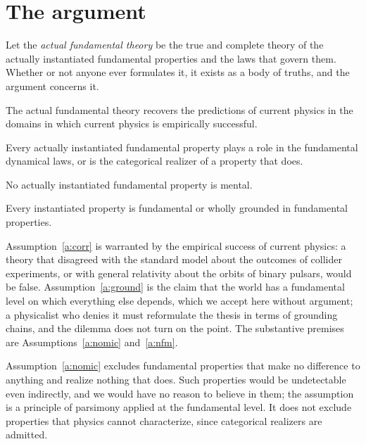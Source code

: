 \documentclass{situationist-preprint}
\begin{document}
\section{The argument}\label{s:argument}

Let the \emph{actual fundamental theory} be the true and complete theory of the actually instantiated fundamental properties and the laws that govern them. Whether or not anyone ever formulates it, it exists as a body of truths, and the argument concerns it.

\begin{assumption}[Correspondence]\label{a:corr}
The actual fundamental theory recovers the predictions of current physics in the domains in which current physics is empirically successful.
\end{assumption}

\begin{assumption}\label{a:nomic}
Every actually instantiated fundamental property plays a role in the fundamental dynamical laws, or is the categorical realizer of a property that does.
\end{assumption}

\begin{assumption}\label{a:nfm}
No actually instantiated fundamental property is mental.
\end{assumption}

\begin{assumption}\label{a:ground}
Every instantiated property is fundamental or wholly grounded in fundamental properties.
\end{assumption}

Assumption~\ref{a:corr} is warranted by the empirical success of current physics: a theory that disagreed with the standard model about the outcomes of collider experiments, or with general relativity about the orbits of binary pulsars, would be false. Assumption~\ref{a:ground} is the claim that the world has a fundamental level on which everything else depends, which we accept here without argument; a physicalist who denies it must reformulate the thesis in terms of grounding chains, and the dilemma does not turn on the point. The substantive premises are Assumptions~\ref{a:nomic} and~\ref{a:nfm}.

Assumption~\ref{a:nomic} excludes fundamental properties that make no difference to anything and realize nothing that does. Such properties would be undetectable even indirectly, and we would have no reason to believe in them; the assumption is a principle of parsimony applied at the fundamental level. It does not exclude properties that physics cannot characterize, since categorical realizers are admitted.
\end{document}

